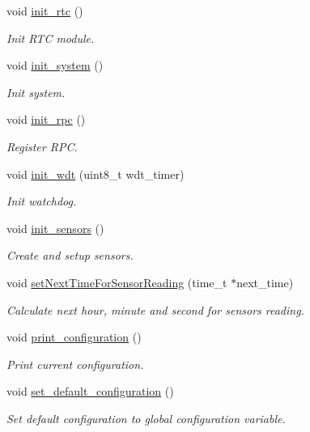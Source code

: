 \begin{DoxyCompactItemize}
void \hyperlink{rmap_8ino_ab985cc69f5f573113405b4f118c96d33}{init\+\_\+rtc} ()
\begin{DoxyCompactList}\small\item\em Init R\+TC module. \end{DoxyCompactList}\item 
void \hyperlink{rmap_8ino_afceb890a6ab9be73cc5481369538c705}{init\+\_\+system} ()
\begin{DoxyCompactList}\small\item\em Init system. \end{DoxyCompactList}\item 
void \hyperlink{rmap_8ino_ad1555e354b3ec88ba71d3a90b06ed014}{init\+\_\+rpc} ()
\begin{DoxyCompactList}\small\item\em Register R\+PC. \end{DoxyCompactList}\item 
void \hyperlink{rmap_8ino_a980e73df66b14b1190bc25da430a4f12}{init\+\_\+wdt} (uint8\+\_\+t wdt\+\_\+timer)
\begin{DoxyCompactList}\small\item\em Init watchdog. \end{DoxyCompactList}\item 
void \hyperlink{rmap_8ino_ac74850003fab6eb3269bfe043d0f939c}{init\+\_\+sensors} ()
\begin{DoxyCompactList}\small\item\em Create and setup sensors. \end{DoxyCompactList}\item 
void \hyperlink{rmap_8ino_a1686e2719fa4a37ef933458673973d28}{set\+Next\+Time\+For\+Sensor\+Reading} (time\+\_\+t $\ast$next\+\_\+time)
\begin{DoxyCompactList}\small\item\em Calculate next hour, minute and second for sensors reading. \end{DoxyCompactList}\item 
void \hyperlink{rmap_8ino_a65b2dadc0411e43874ec8ed7f73bc62a}{print\+\_\+configuration} ()
\begin{DoxyCompactList}\small\item\em Print current configuration. \end{DoxyCompactList}\item 
void \hyperlink{rmap_8ino_a951e4934b8add405b8fe45417fc380f5}{set\+\_\+default\+\_\+configuration} ()
\begin{DoxyCompactList}\small\item\em Set default configuration to global configuration variable. \end{DoxyCompactList}\item 

\end{DoxyCompactItemize}
